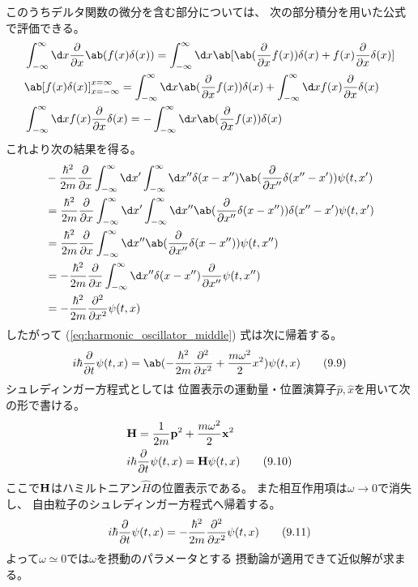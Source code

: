 このうちデルタ関数の微分を含む部分については、
次の部分積分を用いた公式で評価できる。
\begin{equation}
  \begin{split}
    &\int_{-\infty}^\infty\d x
    \pdv{}{x}\ab(f(x)\delta(x))
    = \int_{-\infty}^\infty\d x
    \ab[
      \ab(\pdv{}{x}f(x))\delta(x)
      +f(x)\pdv{}{x}\delta(x)
    ]\\
    &\ab[f(x)\delta(x)]^{x=\infty}_{x=-\infty}
    =
    \int_{-\infty}^\infty\d x
    \ab(\pdv{}{x}f(x))\delta(x)
    +\int_{-\infty}^\infty\d x
    f(x)\pdv{}{x}\delta(x) \\
    &\int_{-\infty}^\infty\d x
    f(x)\pdv{}{x}\delta(x)
    =-
    \int_{-\infty}^\infty\d x
    \ab(\pdv{}{x}f(x))\delta(x)
  \end{split}
\end{equation}
これより次の結果を得る。
\begin{equation}
  \begin{split}
    &-\frac{\hbar^2}{2m}\pdv{}{x}
    \int_{-\infty}^\infty\d x'\int_{-\infty}^\infty\d x''
    \delta(x-x'')\ab(\pdv{}{x''}\delta(x''-x'))
    \psi(t,x') \\
    &=
    \frac{\hbar^2}{2m}\pdv{}{x}
    \int_{-\infty}^\infty\d x'\int_{-\infty}^\infty\d x''
    \ab(\pdv{}{x''}\delta(x-x''))
    \delta(x''-x')
    \psi(t,x') \\
    &=
    \frac{\hbar^2}{2m}\pdv{}{x}
    \int_{-\infty}^\infty\d x''
    \ab(\pdv{}{x''}\delta(x-x''))
    \psi(t,x'') \\
    &=
    -\frac{\hbar^2}{2m}\pdv{}{x}
    \int_{-\infty}^\infty\d x''
    \delta(x-x'')
    \pdv{}{x''}\psi(t,x'') \\
    &=-\frac{\hbar^2}{2m}\pdv[order={2}]{}{x}\psi(t,x)
  \end{split}
\end{equation}
したがって (\ref{eq:harmonic_oscillator_middle}) 式は次に帰着する。
\begin{equation}
  \label{eq:harmonic_oscillator_schrodinger}
  i\hbar\pdv{}{t}\psi(t,x)
  =\ab(-\frac{\hbar^2}{2m}\pdv[order={2}]{}{x}+\frac{m\omega^2}{2}x^2)\psi(t,x)
  \tag{9.9}
\end{equation}
シュレディンガー方程式としては
位置表示の運動量・位置演算子$\hat{p},\hat{x}$を用いて次の形で書ける。
\begin{align}
   & \vb{H}=\frac{1}{2m}\vb{p}^2+\frac{m\omega^2}{2}\vb{x}^2 \\
   \label{eq:harmonic_oscillator_H_in_x}
   & i\hbar\pdv{}{t}\psi(t,x)=\vb{H}\psi(t,x) \tag{9.10}
\end{align}
ここで$\vb{H}$はハミルトニアン$\hat{H}$の位置表示である。
また相互作用項は$\omega\rightarrow0$で消失し、
自由粒子のシュレディンガー方程式へ帰着する。
\begin{equation}
  i\hbar\pdv{}{t}\psi(t,x)
  =-\frac{\hbar^2}{2m}\pdv[order={2}]{}{x}\psi(t,x)
  \tag{9.11}
\end{equation}
よって$\omega\simeq0$では$\omega$を摂動のパラメータとする
摂動論が適用できて近似解が求まる。
